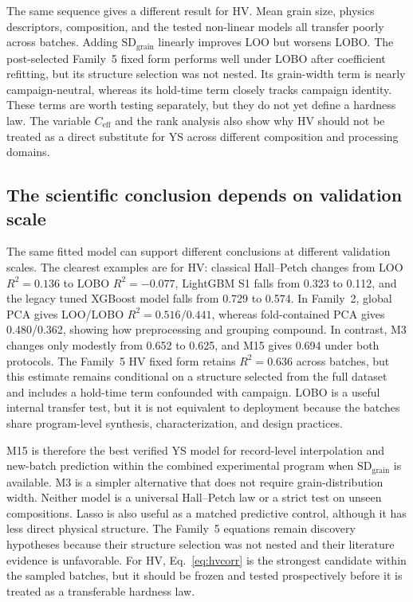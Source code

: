 \documentclass[5p,times,twocolumn]{elsarticle}
\begin{document}
The same sequence gives a different result for HV. Mean grain size, physics descriptors, composition, and the tested non-linear models all transfer poorly across batches. Adding $\mathrm{SD}_{\mathrm{grain}}$ linearly improves LOO but worsens LOBO. The post-selected Family~5 fixed form performs well under LOBO after coefficient refitting, but its structure selection was not nested. Its grain-width term is nearly campaign-neutral, whereas its hold-time term closely tracks campaign identity. These terms are worth testing separately, but they do not yet define a hardness law. The variable $C_{\mathrm{eff}}$ and the rank analysis also show why HV should not be treated as a direct substitute for YS across different composition and processing domains.

\subsection{The scientific conclusion depends on validation scale}

The same fitted model can support different conclusions at different validation scales. The clearest examples are for HV: classical Hall--Petch changes from LOO $R^2=0.136$ to LOBO $R^2=-0.077$, LightGBM S1 falls from 0.323 to 0.112, and the legacy tuned XGBoost model falls from 0.729 to 0.574. In Family~2, global PCA gives LOO/LOBO $R^2=0.516/0.441$, whereas fold-contained PCA gives 0.480/0.362, showing how preprocessing and grouping compound. In contrast, M3 changes only modestly from 0.652 to 0.625, and M15 gives 0.694 under both protocols. The Family~5 HV fixed form retains $R^2=0.636$ across batches, but this estimate remains conditional on a structure selected from the full dataset and includes a hold-time term confounded with campaign. LOBO is a useful internal transfer test, but it is not equivalent to deployment because the batches share program-level synthesis, characterization, and design practices.

M15 is therefore the best verified YS model for record-level interpolation and new-batch prediction within the combined experimental program when $\mathrm{SD}_{\mathrm{grain}}$ is available. M3 is a simpler alternative that does not require grain-distribution width. Neither model is a universal Hall--Petch law or a strict test on unseen compositions. Lasso is also useful as a matched predictive control, although it has less direct physical structure. The Family~5 equations remain discovery hypotheses because their structure selection was not nested and their literature evidence is unfavorable. For HV, Eq.~\eqref{eq:hvcorr} is the strongest candidate within the sampled batches, but it should be frozen and tested prospectively before it is treated as a transferable hardness law.
\end{document}
